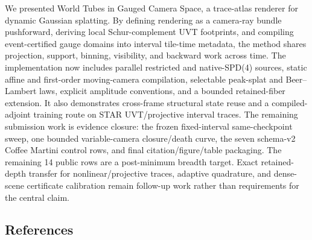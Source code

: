 \documentclass[
]{article}
\begin{document}
We presented World Tubes in Gauged Camera Space, a trace-atlas renderer
for dynamic Gaussian splatting. By defining rendering as a camera-ray
bundle pushforward, deriving local Schur-complement UVT footprints, and
compiling event-certified gauge domains into interval tile-time
metadata, the method shares projection, support, binning, visibility,
and backward work across time. The implementation now includes parallel
restricted and native-SPD(4) sources, static affine and first-order
moving-camera compilation, selectable peak-splat and Beer--Lambert laws,
explicit amplitude conventions, and a bounded retained-fiber extension.
It also demonstrates cross-frame structural state reuse and a
compiled-adjoint training route on STAR UVT/projective interval traces.
The remaining submission work is evidence closure: the frozen
fixed-interval same-checkpoint sweep, one bounded variable-camera
closure/death curve, the seven schema-v2 Coffee Martini control rows,
and final citation/figure/table packaging. The remaining 14 public rows
are a post-minimum breadth target. Exact retained-depth transfer for
nonlinear/projective traces, adaptive quadrature, and dense-scene
certificate calibration remain follow-up work rather than requirements
for the central claim.

\subsection{References}\label{references}
\end{document}
